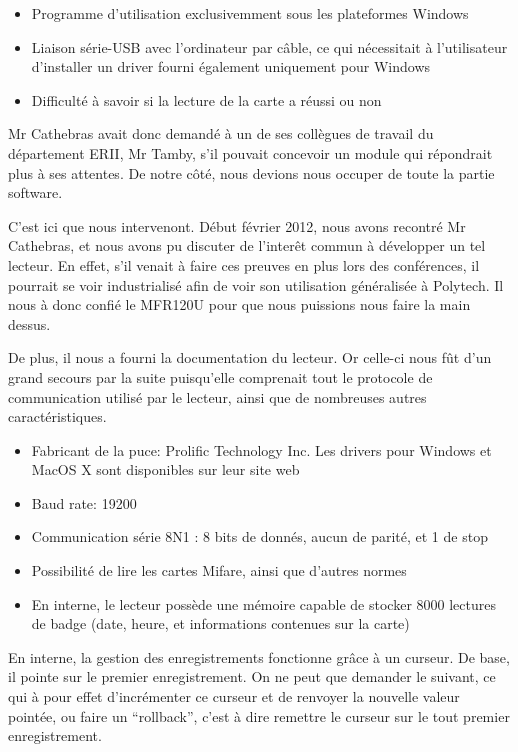    \begin{itemize}
    \item Programme d'utilisation exclusivemment sous les plateformes Windows
    \item Liaison série-USB avec l'ordinateur par câble, ce qui nécessitait 
          à l'utilisateur d'installer un driver fourni également uniquement pour Windows
    \item Difficulté à savoir si la lecture de la carte a réussi ou non
    \end{itemize}

Mr Cathebras avait donc demandé à un de ses collègues de travail du département
ERII, Mr Tamby, s'il pouvait concevoir un module qui répondrait plus à ses attentes.
De notre côté, nous devions nous occuper de toute la partie software.

C'est ici que nous intervenont. Début février 2012, nous avons recontré Mr Cathebras,
et nous avons pu discuter de l'interêt commun à développer un tel lecteur. En effet,
s'il venait à faire ces preuves en plus lors des conférences, il pourrait se voir
industrialisé afin de voir son utilisation généralisée à Polytech. Il nous à donc
confié le MFR120U pour que nous puissions nous faire la main dessus.


De plus, il nous a fourni la documentation du lecteur. Or celle-ci nous fût d'un
grand secours par la suite puisqu'elle comprenait tout le protocole de communication
utilisé par le lecteur, ainsi que de nombreuses autres caractéristiques.

    \begin{itemize}
    \item Fabricant de la puce: Prolific Technology Inc. Les drivers pour Windows
          et MacOS X sont disponibles sur leur site web \cite{prolific}
    \item Baud rate: 19200
    \item Communication série 8N1 : 8 bits de donnés, aucun de parité, et 1 de stop
    \item Possibilité de lire les cartes Mifare, ainsi que d'autres normes
    \item En interne, le lecteur possède une mémoire capable de stocker 8000
          lectures de badge (date, heure, et informations contenues sur la carte)
    \end{itemize}

En interne, la gestion des enregistrements fonctionne grâce à un curseur.
De base, il pointe sur le premier enregistrement. On ne peut que demander le suivant,
ce qui à pour effet d'incrémenter ce curseur et de renvoyer la nouvelle valeur
pointée, ou faire un ``rollback'', c'est à dire remettre le curseur sur le tout
premier enregistrement.

